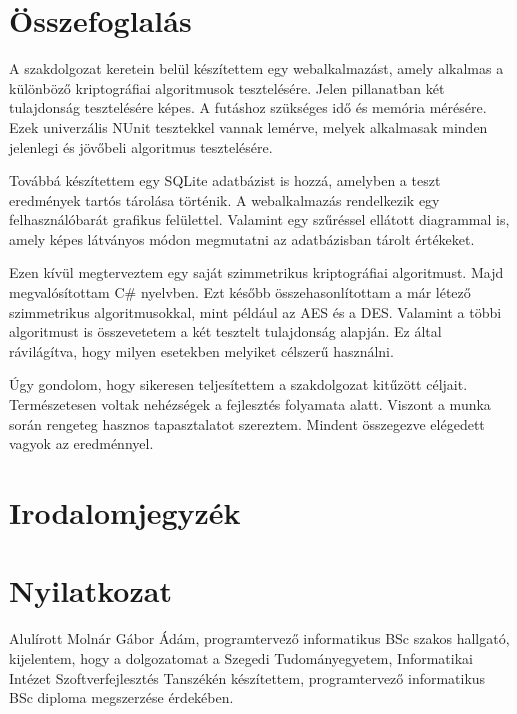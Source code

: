 \documentclass[12pt]{report} %
\begin{document}
\chapter{Összefoglalás} %

A szakdolgozat keretein belül készítettem egy webalkalmazást, amely alkalmas a különböző kriptográfiai algoritmusok tesztelésére. Jelen pillanatban két tulajdonság tesztelésére képes. A futáshoz szükséges idő és memória mérésére. Ezek univerzális NUnit tesztekkel vannak lemérve, melyek alkalmasak minden jelenlegi és jövőbeli algoritmus tesztelésére.

Továbbá készítettem egy SQLite adatbázist is hozzá, amelyben a teszt eredmények tartós tárolása történik. A webalkalmazás rendelkezik egy felhasználóbarát grafikus felülettel. Valamint egy szűréssel ellátott diagrammal is, amely képes látványos módon megmutatni az adatbázisban tárolt értékeket.

Ezen kívül megterveztem egy saját szimmetrikus kriptográfiai algoritmust. Majd megvalósítottam C\# nyelvben. Ezt később összehasonlítottam a már létező szimmetrikus algoritmusokkal, mint például az AES és a DES. Valamint a többi algoritmust is összevetetem a két tesztelt tulajdonság alapján. Ez által rávilágítva, hogy milyen esetekben melyiket célszerű használni.

Úgy gondolom, hogy sikeresen teljesítettem a szakdolgozat kitűzött céljait. Természetesen voltak nehézségek a fejlesztés folyamata alatt. Viszont a munka során rengeteg hasznos tapasztalatot szereztem. Mindent összegezve elégedett vagyok az eredménnyel.

\chapter*{Irodalomjegyzék} %

\printbibliography[heading=none] %

\chapter*{Nyilatkozat} %

Alulírott Molnár Gábor Ádám, programtervező informatikus BSc szakos hallgató, kijelentem, hogy a dolgozatomat a Szegedi Tudományegyetem, Informatikai Intézet Szoftverfejlesztés Tanszékén készítettem, programtervező informatikus BSc diploma megszerzése érdekében.
\end{document}
